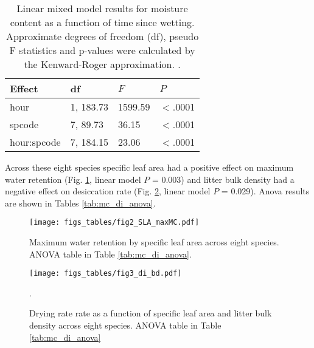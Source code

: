 \documentclass[fire,article,submit,moreauthors,pdftex]{Definitions/mdpi}
\begin{document}
\begin{table}[H]
  \caption{Linear mixed model results for moisture content as a function of time since
    wetting. Approximate degrees of freedom (df), pseudo F statistics and p-values
    were calculated by the Kenward-Roger approximation.
    \cite{Kenward_Roger-1997}.}
  \label{tab:drydown}
\centering
\begin{tabular}{llll}
  \toprule
Effect & df & $F$ & $P$ \\ 
  \midrule
hour & 1, 183.73 & 1599.59 & $<$.0001 \\ 
  spcode & 7, 89.73 & 36.15 & $<$.0001 \\ 
  hour:spcode & 7, 184.15 & 23.06 & $<$.0001 \\ 
   \bottomrule
\end{tabular}
\end{table}


Across these eight species specific leaf area had a positive effect on maximum
water retention (Fig. \ref{fig:maxmc-di}, linear model $P$ = 0.003) and litter
bulk density had a negative effect on desiccation rate (Fig. \ref{fig:bd-di},
linear model $P$ = 0.029). Anova results are shown in Tables \ref{tab:mc_di_anova}.

\begin{figure}[H]
  \centering
\texttt{[image: figs\_tables/fig2\_SLA\_maxMC.pdf]}
\caption{Maximum water retention by specific leaf area across eight species. ANOVA table in Table \ref{tab:mc_di_anova}.}
  \label{fig:maxmc-di}
\end{figure}


\begin{figure}[H]
  \centering
\texttt{[image: figs\_tables/fig3\_di\_bd.pdf]}
\caption{Drying rate rate as a function of specific leaf area and litter bulk density across eight species. ANOVA table in Table \ref{tab:mc_di_anova}}.
  \label{fig:bd-di}
\end{figure}
\end{document}

